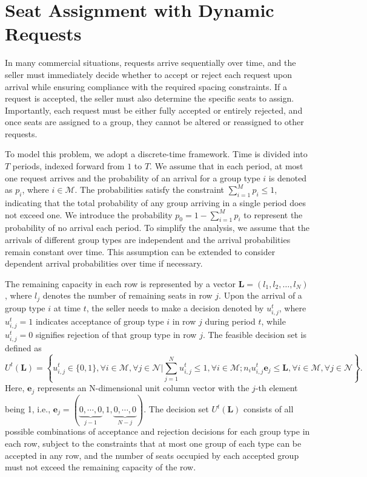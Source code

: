 \section{Seat Assignment with Dynamic Requests}\label{sec_dynamic_seat}
In many commercial situations, requests arrive sequentially over time, and the seller must immediately decide whether to accept or reject each request upon arrival while ensuring compliance with the required spacing constraints. If a request is accepted, the seller must also determine the specific seats to assign. Importantly, each request must be either fully accepted or entirely rejected, and once seats are assigned to a group, they cannot be altered or reassigned to other requests.

To model this problem, we adopt a discrete-time framework. Time is divided into $T$ periods, indexed forward from $1$ to $T$. We assume that in each period, at most one request arrives and the probability of an arrival for a group type $i$ is denoted as $p_i$, where $i \in \mathcal{M}$. The probabilities satisfy the constraint $\sum_{i=1}^M p_i \leq 1$, indicating that the total probability of any group arriving in a single period does not exceed one. We introduce the probability $p_0 = 1 - \sum_{i=1}^{M} p_i$ to represent the probability of no arrival each period. To simplify the analysis, we assume that the arrivals of different group types are independent and the arrival probabilities remain constant over time. This assumption can be extended to consider dependent arrival probabilities over time if necessary.

The remaining capacity in each row is represented by a vector $\mathbf{L} = (l_1, l_2, \ldots, l_N)$, where $l_j$ denotes the number of remaining seats in row $j$. Upon the arrival of a group type $i$ at time $t$, the seller needs to make a decision denoted by $u_{i,j}^{t}$, where $u_{i,j}^{t} = 1$ indicates acceptance of group type $i$ in row $j$ during period $t$, while $u_{i,j}^{t} = 0$ signifies rejection of that group type in row $j$. The feasible decision set is defined as $$U^{t}(\mathbf{L}) = \left\{u_{i,j}^{t} \in \{0,1\}, \forall i \in \mathcal{M}, \forall j \in \mathcal{N} \big| \sum_{j=1}^{N} u_{i,j}^{t} \leq 1, \forall i \in \mathcal{M}; n_{i}u_{i,j}^{t}\mathbf{e}_j \leq \mathbf{L}, \forall i \in \mathcal{M}, \forall j \in \mathcal{N}\right\}.$$
Here, $\mathbf{e}_j$ represents an N-dimensional unit column vector with the $j$-th element being 1, i.e., $\mathbf{e}_j = (\underbrace{0, \cdots, 0}_{j-1}, 1, \underbrace{0, \cdots, 0}_{N-j})$. The decision set $U^{t}(\mathbf{L})$ consists of all possible combinations of acceptance and rejection decisions for each group type in each row, subject to the constraints that at most one group of each type can be accepted in any row, and the number of seats occupied by each accepted group must not exceed the remaining capacity of the row.

